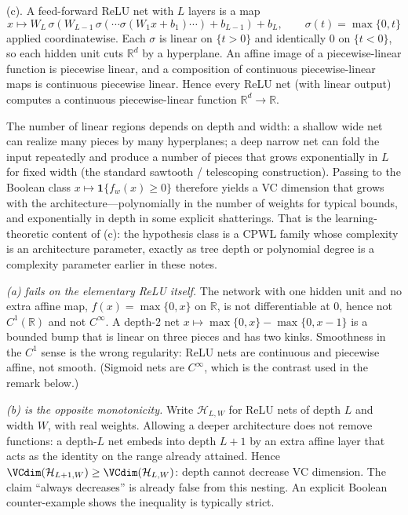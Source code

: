 \begin{solution}
(c). A feed-forward ReLU net with $L$ layers is a map
\[
x\mapsto W_L\,\sigma(W_{L-1}\,\sigma(\cdots\sigma(W_1 x+b_1)\cdots)+b_{L-1})+b_L,
\qquad
\sigma(t)=\max\{0,t\}
\]
applied coordinatewise. Each $\sigma$ is linear on $\{t>0\}$ and identically $0$ on $\{t<0\}$, so each hidden unit cuts $\mathbb{R}^d$ by a hyperplane. An affine image of a piecewise-linear function is piecewise linear, and a composition of continuous piecewise-linear maps is continuous piecewise linear. Hence every ReLU net (with linear output) computes a continuous piecewise-linear function $\mathbb{R}^d\to\mathbb{R}$.

The number of linear regions depends on depth and width: a shallow wide net can realize many pieces by many hyperplanes; a deep narrow net can fold the input repeatedly and produce a number of pieces that grows exponentially in $L$ for fixed width (the standard sawtooth / telescoping construction). Passing to the Boolean class $x\mapsto\mathbf{1}\{f_w(x)\ge 0\}$ therefore yields a VC dimension that grows with the architecture---polynomially in the number of weights for typical bounds, and exponentially in depth in some explicit shatterings. That is the learning-theoretic content of (c): the hypothesis class is a CPWL family whose complexity is an architecture parameter, exactly as tree depth or polynomial degree is a complexity parameter earlier in these notes.

\textit{(a) fails on the elementary ReLU itself.}
The network with one hidden unit and no extra affine map, $f(x)=\max\{0,x\}$ on $\mathbb{R}$, is not differentiable at $0$, hence not $C^1(\mathbb{R})$ and not $C^\infty$. A depth-$2$ net $x\mapsto\max\{0,x\}-\max\{0,x-1\}$ is a bounded bump that is linear on three pieces and has two kinks. Smoothness in the $C^1$ sense is the wrong regularity: ReLU nets are continuous and piecewise affine, not smooth. (Sigmoid nets are $C^\infty$, which is the contrast used in the remark below.)

\textit{(b) is the opposite monotonicity.}
Write $\mathcal{H}_{L,W}$ for ReLU nets of depth $L$ and width $W$, with real weights. Allowing a deeper architecture does not remove functions: a depth-$L$ net embeds into depth $L+1$ by an extra affine layer that acts as the identity on the range already attained. Hence $\VCdim(\mathcal{H}_{L+1,W})\ge\VCdim(\mathcal{H}_{L,W})$: depth cannot decrease VC dimension. The claim ``always decreases'' is already false from this nesting. An explicit Boolean counter-example shows the inequality is typically strict.


\end{solution}
